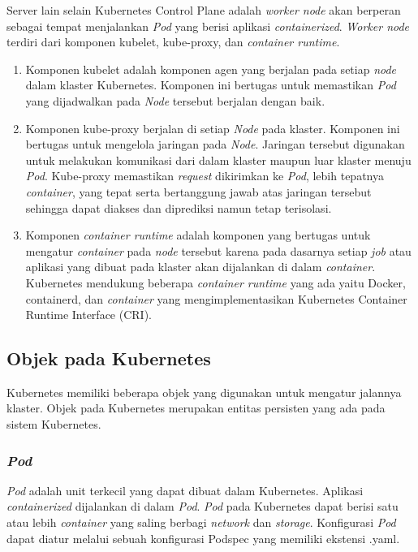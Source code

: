 Server lain selain Kubernetes Control Plane adalah \emph{worker node}
akan berperan sebagai tempat menjalankan \emph{Pod} yang berisi aplikasi
\emph{containerized}. \emph{Worker node} terdiri dari komponen kubelet, kube-proxy,
dan \emph{container runtime}.

\begin{enumerate}[itemsep=-0.2cm, topsep=-0.3cm]
  \item{Komponen kubelet adalah komponen agen yang berjalan pada
    setiap \emph{node} dalam klaster Kubernetes. Komponen ini bertugas untuk
    memastikan \emph{Pod} yang dijadwalkan pada \emph{Node} tersebut berjalan
    dengan baik.
  }
  \item{Komponen kube-proxy berjalan di setiap \emph{Node} pada
    klaster. Komponen ini bertugas untuk mengelola jaringan pada \emph{Node}.
    Jaringan tersebut digunakan untuk melakukan komunikasi dari dalam klaster
    maupun luar klaster menuju \emph{Pod}. Kube-proxy memastikan \emph{request}
    dikirimkan ke \emph{Pod}, lebih tepatnya \emph{container}, yang tepat serta bertanggung
    jawab atas jaringan tersebut sehingga dapat diakses dan diprediksi namun tetap terisolasi.
  }
  \item{Komponen \emph{container runtime} adalah komponen yang bertugas
    untuk mengatur \emph{container} pada \emph{node} tersebut karena pada dasarnya setiap
    \emph{job} atau aplikasi yang dibuat pada klaster akan dijalankan di dalam \emph{container}.
    Kubernetes mendukung beberapa \emph{container runtime} yang ada yaitu Docker, containerd, dan
    \emph{container} yang mengimplementasikan Kubernetes Container Runtime Interface (CRI).
  }
\end{enumerate}

\subsection{Objek pada Kubernetes}

Kubernetes memiliki beberapa objek yang digunakan untuk mengatur jalannya
klaster. Objek pada Kubernetes merupakan entitas persisten yang ada pada sistem
Kubernetes. 

\subsubsection{\emph{Pod}}

\emph{Pod} adalah unit terkecil yang dapat dibuat dalam Kubernetes. Aplikasi
\emph{containerized} dijalankan di dalam \emph{Pod}. \emph{Pod} pada Kubernetes
dapat berisi satu atau lebih \emph{container} yang saling berbagi \emph{network}
dan \emph{storage}. Konfigurasi \emph{Pod} dapat diatur melalui sebuah konfigurasi
Podspec yang memiliki ekstensi .yaml.

